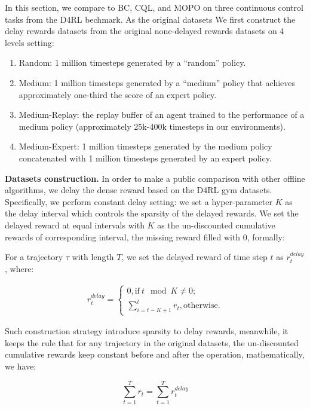 In this section, we compare to BC, CQL, and MOPO on three continuous control tasks from the D4RL bechmark. As the original datasets We first construct the delay rewards datasets from the original none-delayed rewards datasets on 4 levels setting:

\begin{enumerate}
    \item Random: 1 million timesteps generated by a “random” policy.
    \item Medium: 1 million timesteps generated by a “medium” policy that achieves approximately one-third the score of an expert policy.
    \item Medium-Replay: the replay buffer of an agent trained to the performance of a medium policy (approximately 25k-400k timesteps in our environments).
    \item Medium-Expert: 1 million timesteps generated by the medium policy concatenated with 1 million timesteps generated by an expert policy.
\end{enumerate}

\textbf{Datasets construction.} In order to make a public comparison with other offline algorithms, we delay the dense reward based on the D4RL gym datasets. Specifically, we perform constant delay setting: we set a hyper-parameter $K$ as the delay interval which controls the sparsity of the delayed rewards. We set the delayed reward at equal intervals with $K$ as the un-discounted cumulative rewards of corresponding interval, the missing reward filled with 0, formally:

For a trajectory $\tau$ with length $T$, we set the delayed reward of time step $t$ as $r_t^{delay}$, where:

$$
\begin{aligned}
r_t^{delay} = \begin{cases}
0, \text{if} \ t \mod K \neq 0; \\
\sum_{i = t - K + 1}^t r_t, \text{otherwise}.
\end{cases}
\end{aligned}
$$

Such construction strategy introduce sparsity to delay rewards, meanwhile, it keeps the rule that for any trajectory in the original datasets, the un-discounted cumulative rewards keep constant before and after the operation, mathematically, we have:

$$
\sum_{t = 1}^{T} r_t = \sum_{t = 1}^{T} r_t^{delay}
$$

